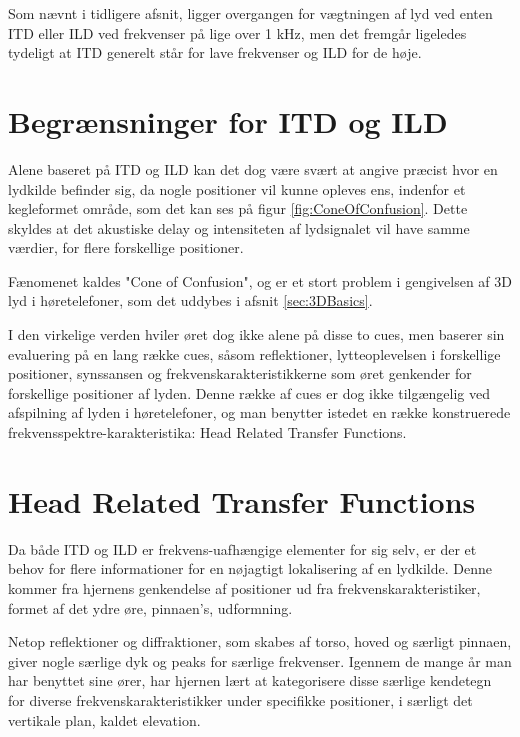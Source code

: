 Som nævnt i tidligere afsnit, ligger overgangen for vægtningen af lyd ved enten ITD eller ILD ved frekvenser på lige over 1 kHz, men det fremgår ligeledes tydeligt at ITD generelt står for lave frekvenser og ILD for de høje.

\section{Begrænsninger for ITD og ILD} 
Alene baseret på ITD og ILD kan det dog være svært at angive præcist hvor en lydkilde befinder sig, da nogle positioner vil kunne opleves ens, indenfor et kegleformet område, som det kan ses på figur \ref{fig:ConeOfConfusion}. Dette skyldes at det akustiske delay og intensiteten af lydsignalet vil have samme værdier, for flere forskellige positioner. 


Fænomenet kaldes "Cone of Confusion", og er et stort problem i gengivelsen af 3D lyd i høretelefoner, som det uddybes i afsnit \ref{sec:3DBasics}. 

I den virkelige verden hviler øret dog ikke alene på disse to cues, men baserer sin evaluering på en lang række cues, såsom reflektioner, lytteoplevelsen i forskellige positioner, synssansen og frekvenskarakteristikkerne som øret genkender for forskellige positioner af lyden. Denne række af cues er dog ikke tilgængelig ved afspilning af lyden i høretelefoner, og man benytter istedet en række konstruerede frekvensspektre-karakteristika: Head Related Transfer Functions.

\section{Head Related Transfer Functions}
\label{sec:HRTF}

Da både ITD og ILD er frekvens-uafhængige elementer for sig selv, er der et behov for flere informationer for en nøjagtigt lokalisering af en lydkilde. Denne kommer fra hjernens genkendelse af positioner ud fra frekvenskarakteristiker, formet af det ydre øre, pinnaen's, udformning. 

Netop reflektioner og diffraktioner, som skabes af torso, hoved og særligt pinnaen, giver nogle særlige dyk og peaks for særlige frekvenser. Igennem de mange år man har benyttet sine ører, har hjernen lært at kategorisere disse særlige kendetegn for diverse frekvenskarakteristikker under specifikke positioner, i særligt det vertikale plan, kaldet elevation.	

